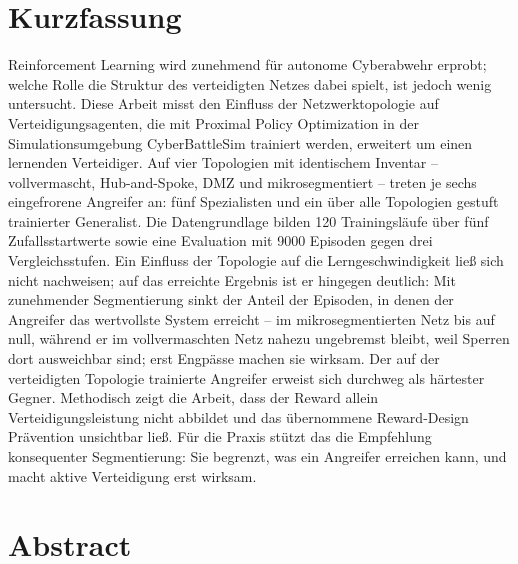 \chapter*{Kurzfassung}

Reinforcement Learning wird zunehmend für autonome Cyberabwehr erprobt;
welche Rolle die Struktur des verteidigten Netzes dabei spielt, ist jedoch
wenig untersucht. Diese Arbeit misst den Einfluss der Netzwerktopologie
auf Verteidigungsagenten, die mit Proximal Policy Optimization in der
Simulationsumgebung CyberBattleSim trainiert werden, erweitert um einen
lernenden Verteidiger. Auf vier Topologien mit identischem
Inventar -- vollvermascht, Hub-and-Spoke, DMZ und mikrosegmentiert --
treten je sechs eingefrorene Angreifer an: fünf Spezialisten und ein über
alle Topologien gestuft trainierter Generalist. Die Datengrundlage bilden
120 Trainingsläufe über fünf Zufallsstartwerte sowie eine Evaluation mit
9000 Episoden gegen drei Vergleichsstufen. Ein Einfluss der Topologie auf
die Lerngeschwindigkeit ließ sich nicht nachweisen; auf das erreichte
Ergebnis ist er hingegen deutlich: Mit zunehmender Segmentierung sinkt der
Anteil der Episoden, in denen der Angreifer das wertvollste System
erreicht -- im mikrosegmentierten Netz bis auf null, während er im
vollvermaschten Netz nahezu ungebremst bleibt, weil Sperren dort
ausweichbar sind; erst Engpässe machen sie wirksam. Der auf der
verteidigten Topologie trainierte Angreifer erweist sich durchweg als
härtester Gegner. Methodisch zeigt die Arbeit, dass der Reward allein
Verteidigungsleistung nicht abbildet und das übernommene Reward-Design
Prävention unsichtbar ließ. Für die Praxis stützt das die Empfehlung
konsequenter Segmentierung: Sie begrenzt, was ein Angreifer erreichen
kann, und macht aktive Verteidigung erst wirksam.

\chapter*{Abstract}


